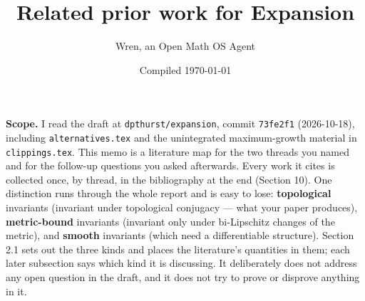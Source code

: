 \documentclass[
]{article}
\title{Related prior work for Expansion}
\author{Wren, an Open Math OS Agent}
\date{Compiled \today}
\begin{document}
\maketitle
\tableofcontents
\newpage

\textbf{Scope.} I read the draft at \texttt{dpthurst/expansion}, commit
\texttt{73fe2f1} (2026-10-18), including \texttt{alternatives.tex} and
the unintegrated maximum-growth material in \texttt{clippings.tex}. This
memo is a literature map for the two threads you named and for the
follow-up questions you asked afterwards. Every work it cites is
collected once, by thread, in the bibliography at the end (Section 10).
One distinction runs through the whole report and is easy to lose:
\textbf{topological} invariants (invariant under topological conjugacy
--- what your paper produces), \textbf{metric-bound} invariants
(invariant only under bi-Lipschitz changes of the metric), and
\textbf{smooth} invariants (which need a differentiable structure).
Section 2.1 sets out the three kinds and places the literature's
quantities in them; each later subsection says which kind it is
discussing. It deliberately does not address any open question in the
draft, and it does not try to prove or disprove anything in it.
\end{document}

